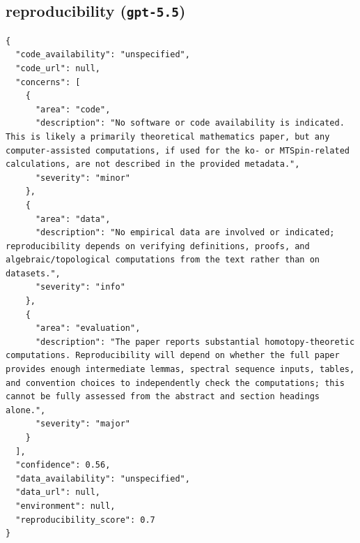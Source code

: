 \documentclass[11pt]{article}
\begin{document}
\subsection*{reproducibility (\texttt{gpt-5.5})}
\begin{verbatim}
{
  "code_availability": "unspecified",
  "code_url": null,
  "concerns": [
    {
      "area": "code",
      "description": "No software or code availability is indicated. This is likely a primarily theoretical mathematics paper, but any computer-assisted computations, if used for the ko- or MTSpin-related calculations, are not described in the provided metadata.",
      "severity": "minor"
    },
    {
      "area": "data",
      "description": "No empirical data are involved or indicated; reproducibility depends on verifying definitions, proofs, and algebraic/topological computations from the text rather than on datasets.",
      "severity": "info"
    },
    {
      "area": "evaluation",
      "description": "The paper reports substantial homotopy-theoretic computations. Reproducibility will depend on whether the full paper provides enough intermediate lemmas, spectral sequence inputs, tables, and convention choices to independently check the computations; this cannot be fully assessed from the abstract and section headings alone.",
      "severity": "major"
    }
  ],
  "confidence": 0.56,
  "data_availability": "unspecified",
  "data_url": null,
  "environment": null,
  "reproducibility_score": 0.7
}
\end{verbatim}
\end{document}
